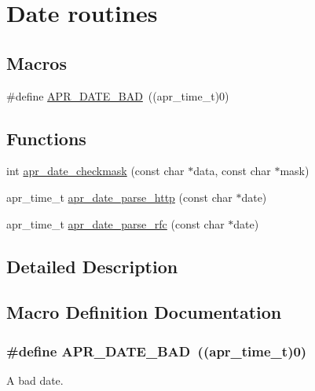 \hypertarget{group___a_p_r___util___date}{\section{Date routines}
\label{group___a_p_r___util___date}
}
\subsection*{Macros}
\begin{DoxyCompactItemize}
\item 
\#define \hyperlink{group___a_p_r___util___date_ga8be88b25f4b477ad13c4067c959411b0}{A\-P\-R\-\_\-\-D\-A\-T\-E\-\_\-\-B\-A\-D}~((apr\-\_\-time\-\_\-t)0)
\end{DoxyCompactItemize}
\subsection*{Functions}
\begin{DoxyCompactItemize}
\item 
int \hyperlink{group___a_p_r___util___date_ga6576e5747a46f262c54dc4286f65d6f8}{apr\-\_\-date\-\_\-checkmask} (const char $\ast$data, const char $\ast$mask)
\item 
apr\-\_\-time\-\_\-t \hyperlink{group___a_p_r___util___date_gabd0ad0c1000ed8c95fb6a9660aed27c6}{apr\-\_\-date\-\_\-parse\-\_\-http} (const char $\ast$date)
\item 
apr\-\_\-time\-\_\-t \hyperlink{group___a_p_r___util___date_gaa6d4a18ff9f40c37c0f145d063c50e96}{apr\-\_\-date\-\_\-parse\-\_\-rfc} (const char $\ast$date)
\end{DoxyCompactItemize}


\subsection{Detailed Description}


\subsection{Macro Definition Documentation}
\hypertarget{group___a_p_r___util___date_ga8be88b25f4b477ad13c4067c959411b0}{
\subsubsection[{A\-P\-R\-\_\-\-D\-A\-T\-E\-\_\-\-B\-A\-D}]{\setlength{\rightskip}{0pt plus 5cm}\#define A\-P\-R\-\_\-\-D\-A\-T\-E\-\_\-\-B\-A\-D~((apr\-\_\-time\-\_\-t)0)}}\label{group___a_p_r___util___date_ga8be88b25f4b477ad13c4067c959411b0}
A bad date. 

